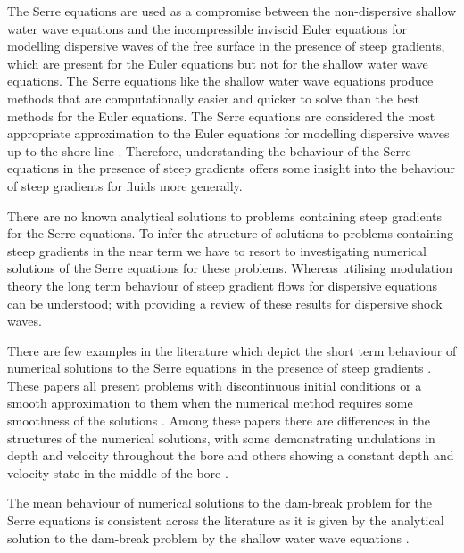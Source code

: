 \documentclass[times]{elsarticle}
\begin{document}
The Serre equations are used as a compromise between the non-dispersive shallow water wave equations and the incompressible inviscid Euler equations for modelling dispersive waves of the free surface in the presence of steep gradients, which are present for the Euler equations \cite{Mitsotakis-etal-2017} but not for the shallow water wave equations. The Serre equations like the shallow water wave equations produce methods \cite{Hank-etal-2010-2034,Zoppou-etal-2016,Zoppou-etal-2017} that are computationally easier and quicker to solve than the best methods for the Euler equations. The Serre equations are considered the most appropriate approximation to the Euler equations for modelling dispersive waves up to the shore line \cite{Bonneton-etal-2011-589,Bonneton-etal-2011-1479}. Therefore, understanding the behaviour of the Serre equations in the presence of steep gradients offers some insight into the behaviour of steep gradients for fluids more generally.

There are no known analytical solutions to problems containing steep gradients for the Serre equations. To infer the structure of solutions to problems containing steep gradients in the near term we have to resort to investigating numerical solutions of the Serre equations for these problems. Whereas utilising modulation theory the long term behaviour of steep gradient flows for dispersive equations can be understood; with \citet{El-Hoefer-2016-11} providing a review of these results for dispersive shock waves.

There are few examples in the literature which depict the short term behaviour of numerical solutions to the Serre equations in the presence of steep gradients \cite{El-etal-2006,Hank-etal-2010-2034,Mitsotakis-etal-2014,Mitsotakis-etal-2017,Zoppou-etal-2016,Zoppou-etal-2017}. These papers all present problems with discontinuous initial conditions \cite{Hank-etal-2010-2034,Zoppou-etal-2016,Zoppou-etal-2017} or a smooth approximation to them when the numerical method requires some smoothness of the solutions \cite{El-etal-2006,Mitsotakis-etal-2014,Mitsotakis-etal-2017}. Among these papers there are differences in the structures of the numerical solutions, with some demonstrating undulations in depth and velocity throughout the bore \cite{El-etal-2006,Zoppou-etal-2016,Zoppou-etal-2017} and others showing a constant depth and velocity state in the middle of the bore \cite{Hank-etal-2010-2034,Mitsotakis-etal-2014,Mitsotakis-etal-2017}.

The mean behaviour of numerical solutions to the dam-break problem for the Serre equations is consistent across the literature \cite{El-etal-2006,Zoppou-etal-2016,Zoppou-etal-2017,Hank-etal-2010-2034,Mitsotakis-etal-2014,Mitsotakis-etal-2017} as it is given by the analytical solution to the dam-break problem by the shallow water wave equations \cite{El-Hoefer-2016-11}. 
\end{document}
